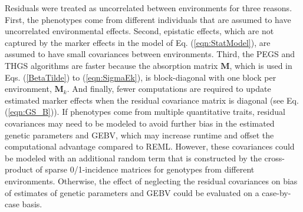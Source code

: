 \documentclass{bmcart}
\begin{document}
Residuals were treated as uncorrelated between environments for three reasons. First, the phenotypes come from different individuals that are assumed to have uncorrelated environmental effects. Second, epistatic effects, which are not captured by the marker effects in the model of Eq. (\ref{eqn:StatModel}), are assumed to have small covariances between environments. Third, the PEGS and THGS algorithms are faster because the absorption matrix $\mathbf{M}$, which is used in Eqs. (\ref{BetaTilde}) to (\ref{eqn:SigmaEk}), is block-diagonal with one block per environment, $\mathbf{M}_k$. And finally, fewer computations are required to update estimated marker effects when the residual covariance matrix is diagonal (see Eq. (\ref{eqn:GS_B})). If phenotypes come from multiple quantitative traits, residual covariances may need to be modeled to avoid further bias in the estimated genetic parameters and GEBV, which may increase runtime \cite{Schaeffer} and offset the computational advantage compared to REML. However, these covariances could be modeled with an additional random term that is constructed by the cross-product of sparse 0/1-incidence matrices for genotypes from different environments. Otherwise, the effect of neglecting the residual covariances on bias of estimates of genetic parameters and GEBV could be evaluated on a case-by-case basis.
\end{document}
